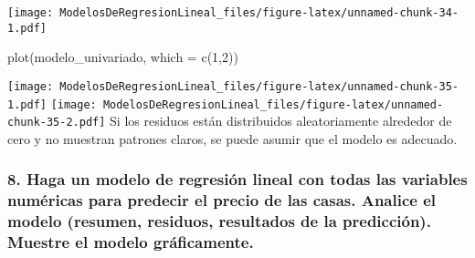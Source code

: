 \documentclass[
]{article}
\newenvironment{Shaded}{\begin{snugshade}}{\end{snugshade}}
\newcommand{\AttributeTok}[1]{\textcolor[rgb]{0.77,0.63,0.00}{#1}}
\newcommand{\DecValTok}[1]{\textcolor[rgb]{0.00,0.00,0.81}{#1}}
\newcommand{\FunctionTok}[1]{\textcolor[rgb]{0.00,0.00,0.00}{#1}}
\newcommand{\NormalTok}[1]{#1}
\begin{document}
\texttt{[image: ModelosDeRegresionLineal\_files/figure-latex/unnamed-chunk-34-1.pdf]}

\begin{Shaded}
\begin{Highlighting}[]
\FunctionTok{plot}\NormalTok{(modelo\_univariado, }\AttributeTok{which =} \FunctionTok{c}\NormalTok{(}\DecValTok{1}\NormalTok{,}\DecValTok{2}\NormalTok{))}
\end{Highlighting}
\end{Shaded}

\texttt{[image: ModelosDeRegresionLineal\_files/figure-latex/unnamed-chunk-35-1.pdf]}
\texttt{[image: ModelosDeRegresionLineal\_files/figure-latex/unnamed-chunk-35-2.pdf]}
Si los residuos están distribuidos aleatoriamente alrededor de cero y no
muestran patrones claros, se puede asumir que el modelo es adecuado.

\hypertarget{haga-un-modelo-de-regresiuxf3n-lineal-con-todas-las-variables-numuxe9ricas-para-predecir-el-precio-de-las-casas.-analice-el-modelo-resumen-residuos-resultados-de-la-predicciuxf3n.-muestre-el-modelo-gruxe1ficamente.}{%
\subsubsection{8. Haga un modelo de regresión lineal con todas las
variables numéricas para predecir el precio de las casas. Analice el
modelo (resumen, residuos, resultados de la predicción). Muestre el
modelo
gráficamente.}\label{haga-un-modelo-de-regresiuxf3n-lineal-con-todas-las-variables-numuxe9ricas-para-predecir-el-precio-de-las-casas.-analice-el-modelo-resumen-residuos-resultados-de-la-predicciuxf3n.-muestre-el-modelo-gruxe1ficamente.}}
\end{document}
